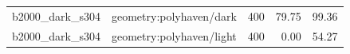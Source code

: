 \begin{longtable}{l>{\raggedright\arraybackslash}p{.42\linewidth}rrr}
b2000\_\allowbreak{}dark\_\allowbreak{}s304 & %
geometry:polyhaven/dark & %
400 & %
79.75 & %
99.36 \\ %

b2000\_\allowbreak{}dark\_\allowbreak{}s304 & %
geometry:polyhaven/light & %
400 & %
0.00 & %
54.27 \\ %


\end{longtable}

